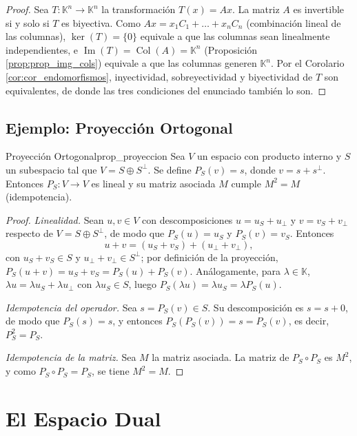 \documentclass[11pt, a4paper]{article}
\begin{document}
\begin{proof}
Sea $T: \mathbb{K}^n \to \mathbb{K}^n$ la transformación $T(x) = Ax$. La matriz $A$ es invertible si y solo si $T$ es biyectiva. Como $Ax = x_1 C_1 + \dots + x_n C_n$ (combinación lineal de las columnas), $\ker(T) = \{0\}$ equivale a que las columnas sean linealmente independientes, e $\operatorname{Im}(T) = \operatorname{Col}(A) = \mathbb{K}^n$ (Proposición \ref{prop:prop_img_cols}) equivale a que las columnas generen $\mathbb{K}^n$. Por el Corolario \ref{cor:cor_endomorfismos}, inyectividad, sobreyectividad y biyectividad de $T$ son equivalentes, de donde las tres condiciones del enunciado también lo son.
\end{proof}

\subsection{Ejemplo: Proyección Ortogonal}

\begin{proposicion}{Proyección Ortogonal}{prop_proyeccion}
Sea $V$ un espacio con producto interno y $S$ un subespacio tal que $V = S \oplus S^\perp$.
Se define $P_S(v) = s$, donde $v = s + s^\perp$.
Entonces $P_S: V \to V$ es lineal y su matriz asociada $M$ cumple $M^2 = M$ (idempotencia).
\end{proposicion}

\begin{proof}
\textit{Linealidad.} Sean $u, v \in V$ con descomposiciones $u = u_S + u_\perp$ y $v = v_S + v_\perp$ respecto de $V = S \oplus S^\perp$, de modo que $P_S(u) = u_S$ y $P_S(v) = v_S$. Entonces
\[ u + v = (u_S + v_S) + (u_\perp + v_\perp), \]
con $u_S + v_S \in S$ y $u_\perp + v_\perp \in S^\perp$; por definición de la proyección, $P_S(u+v) = u_S + v_S = P_S(u) + P_S(v)$. Análogamente, para $\lambda \in \mathbb{K}$, $\lambda u = \lambda u_S + \lambda u_\perp$ con $\lambda u_S \in S$, luego $P_S(\lambda u) = \lambda u_S = \lambda P_S(u)$.

\textit{Idempotencia del operador.} Sea $s = P_S(v) \in S$. Su descomposición es $s = s + 0$, de modo que $P_S(s) = s$, y entonces $P_S(P_S(v)) = s = P_S(v)$, es decir, $P_S^2 = P_S$.

\textit{Idempotencia de la matriz.} Sea $M$ la matriz asociada. La matriz de $P_S \circ P_S$ es $M^2$, y como $P_S \circ P_S = P_S$, se tiene $M^2 = M$.
\end{proof}

\newpage

\section{El Espacio Dual}
\end{document}
